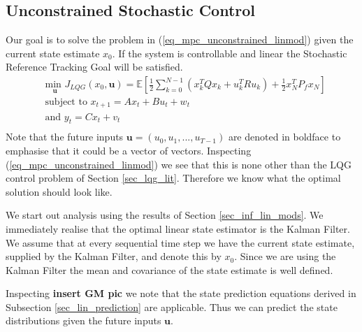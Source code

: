\subsection{Unconstrained Stochastic Control}
Our goal is to solve the problem in (\ref{eq_mpc_unconstrained_linmod}) given the current state estimate $x_0$. If the system is controllable and linear the Stochastic Reference Tracking Goal will be satisfied.
\begin{equation}
\begin{aligned}
&\underset{\mathbf{u}}{\text{min }} J_{LQG}(x_0, \mathbf{u}) = \mathbb{E}\left[ \frac{1}{2}\sum_{k=0}^{N-1} \left( x_k^TQx_k + u_k^TRu_k \right) + \frac{1}{2}x_N^TP_fx_N \right] \\
& \text{subject to } x_{t+1}=Ax_t+Bu_t + w_t \\
& \text{and } y_{t}= Cx_t + v_t \\
\end{aligned}
\label{eq_mpc_unconstrained_linmod}
\end{equation}
Note that the future inputs $\mathbf{u}=(u_0, u_1,...,u_{T-1})$ are denoted in boldface to emphasise that it could be a vector of vectors. Inspecting (\ref{eq_mpc_unconstrained_linmod}) we see that this is none other than the LQG control problem of Section \ref{sec_lqg_lit}. Therefore we know what the optimal solution should look like.

We start out analysis using the results of Section \ref{sec_inf_lin_mods}. We immediately realise that the optimal linear state estimator is the Kalman Filter. We assume that at every sequential time step we have the current state estimate, supplied by the Kalman Filter, and denote this by $x_0$. Since we are using the Kalman Filter the mean and covariance of the state estimate is well defined. 

Inspecting \textbf{insert GM pic} we note that the state prediction equations derived in Subsection \ref{sec_lin_prediction} are applicable. Thus we can predict the state distributions given the future inputs $\mathbf{u}$.

